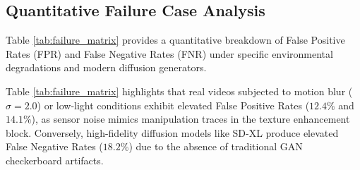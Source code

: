 \subsection{Quantitative Failure Case Analysis}
Table \ref{tab:failure_matrix} provides a quantitative breakdown of False Positive Rates (FPR) and False Negative Rates (FNR) under specific environmental degradations and modern diffusion generators.

\begin{table}[ht]
    \centering
    \caption{Quantitative Failure Matrix across Environmental Perturbations and Forgery Generators.}
    \label{tab:failure_matrix}
    \par{}
\end{table}

Table \ref{tab:failure_matrix} highlights that real videos subjected to motion blur ($\sigma=2.0$) or low-light conditions exhibit elevated False Positive Rates ($12.4\%$ and $14.1\%$), as sensor noise mimics manipulation traces in the texture enhancement block. Conversely, high-fidelity diffusion models like SD-XL produce elevated False Negative Rates ($18.2\%$) due to the absence of traditional GAN checkerboard artifacts.

